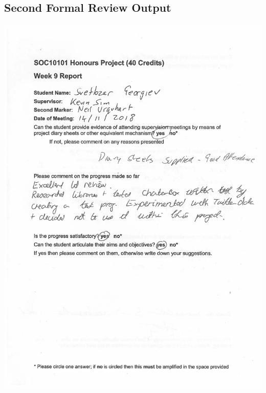 \documentclass[12pt,a4paper]{article}
\begin{document}
\begin{appendices}
\section{Second Formal Review Output}
\includegraphics[width=\textwidth,height=\textheight,keepaspectratio]{interim-1.png}
\newpage

\end{appendices}
\end{document}
